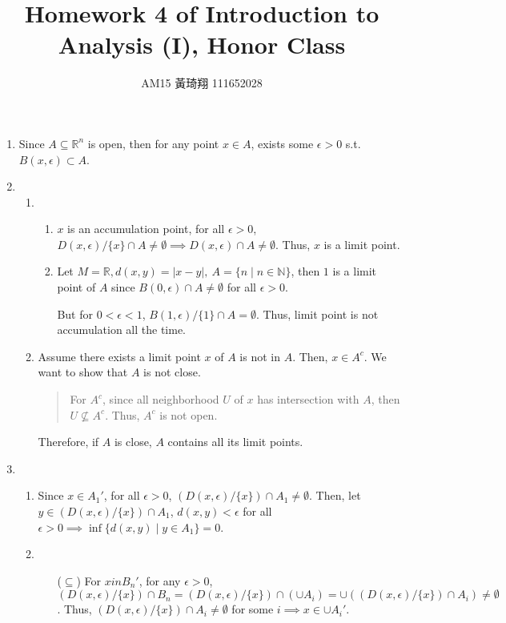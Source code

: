 \documentclass[12pt]{article}
\title{Homework 4 of Introduction to Analysis (I), Honor Class}
\author{AM15 黃琦翔 111652028}
\begin{document}
\maketitle
\begin{enumerate}
    \item Since $A \subseteq \mathbb{R}^n$ is open,
    then for any point $x \in A$, exists some $\epsilon > 0$ s.t. $B(x, \epsilon) \subset A$.

    \item\begin{enumerate}
        \item\begin{enumerate}
            \item $x$ is an accumulation point, for all $\epsilon > 0$, $D(x, \epsilon)/\lbrace x \rbrace \cap A \neq \emptyset\implies D(x, \epsilon) \cap A \neq \emptyset$.
            Thus, $x$ is a limit point.
            \item Let $M = \mathbb{R}, d(x, y) = |x-y|,\ A = \lbrace n \mid n \in \mathbb{N}\rbrace$, then $1$ is a limit point of $A$ since $B(0, \epsilon) \cap A \neq \emptyset$ for all $\epsilon > 0$.
            
            But for $0 < \epsilon < 1$, $B(1, \epsilon)/\lbrace 1 \rbrace \cap A = \emptyset$. Thus, limit point is not accumulation all the time.
        \end{enumerate}
        \item Assume there exists a limit point $x$ of $A$ is not in $A$.
        Then, $x \in A^c$. We want to show that $A$ is not close.
        \begin{quote}
            For $A^c$, since all neighborhood $U$ of $x$ has intersection with $A$, then $U \nsubseteq A^c$. 
            Thus, $A^c$ is not open.
        \end{quote}

        Therefore, if $A$ is close, $A$ contains all its limit points.
    \end{enumerate}
    \newpage

    \item \begin{enumerate}
        \item Since $x \in A_1'$, for all $\epsilon > 0$, $(D(x, \epsilon)/\lbrace x \rbrace) \cap A_1 \neq \emptyset$.
        Then, let $y \in (D(x, \epsilon)/\lbrace x \rbrace) \cap A_1$, $d(x, y) < \epsilon$ for all $\epsilon > 0\implies \inf\lbrace d(x, y) \mid y \in A_1\rbrace = 0$.

        \item \begin{enumerate}
            \item[($\subseteq$)] For $x in B_n'$, for any $\epsilon > 0$, $(D(x, \epsilon) / \lbrace x \rbrace) \cap B_n = (D(x, \epsilon) / \lbrace x \rbrace) \cap (\cup A_i) = \cup((D(x, \epsilon) / \lbrace x \rbrace) \cap A_i) \neq \emptyset$.
            Thus, $(D(x, \epsilon) / \lbrace x \rbrace) \cap A_i\neq \emptyset$ for some $i\implies x \in \cup A_i'$.
            

\end{enumerate}
\end{enumerate}
\end{enumerate}
\end{document}
